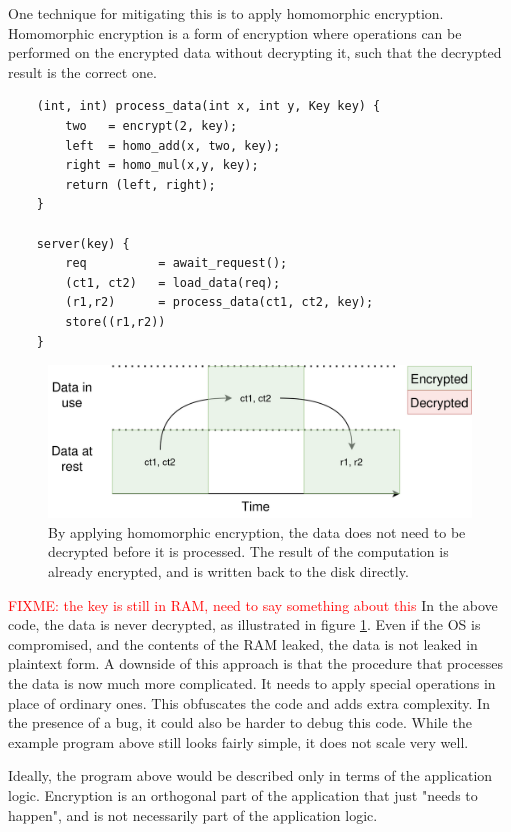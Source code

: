 One technique for mitigating this is to apply homomorphic encryption\cite{DBLP:conf/stoc/Gentry09}. Homomorphic encryption is a form of encryption where
operations can be performed on the encrypted data without decrypting it, such that the decrypted result is the correct one.

\begin{verbatim}
    (int, int) process_data(int x, int y, Key key) {
        two   = encrypt(2, key);
        left  = homo_add(x, two, key);
        right = homo_mul(x,y, key);
        return (left, right);
    }

    server(key) {
        req          = await_request();
        (ct1, ct2)   = load_data(req);
        (r1,r2)      = process_data(ct1, ct2, key);
        store((r1,r2))
    }
\end{verbatim}

\begin{figure}
    \centering
    \includegraphics[scale=0.2]{graphics/safe-data-in-use.png}
    \caption{By applying homomorphic encryption, the data does not need to be decrypted before it is processed. The result
    of the computation is already encrypted, and is written back to the disk directly.}
    \label{graphics:safe-data-in-use}
\end{figure}

\textcolor{red}{FIXME: the key is still in RAM, need to say something about this}
In the above code, the data is never decrypted, as illustrated in figure \ref{graphics:safe-data-in-use}. Even if the OS is compromised, and the contents of the RAM leaked, the
data is not leaked in plaintext form. A downside of this approach is that the procedure that processes the data is now
much more complicated. It needs to apply special operations in place of ordinary ones. This obfuscates the code and
adds extra complexity. In the presence of a bug, it could also be harder to debug this code. While the example program
above still looks fairly simple, it does not scale very well.

Ideally, the program above would be described only in terms of the application logic. Encryption is an orthogonal part of
the application that just "needs to happen", and is not necessarily part of the application logic.

